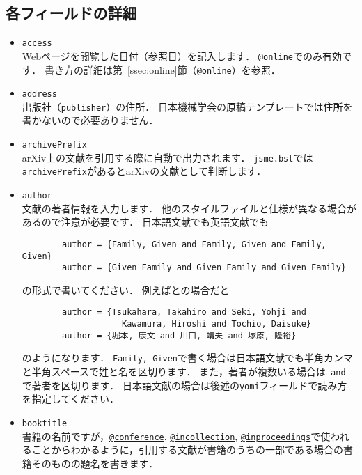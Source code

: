 \documentclass[a4paper,fleqn,uplatex,dvipdfmx]{jsarticle}
\makeatletter
\newcommand{\jsmefile}{\texttt{jsme.bst}}
\newcommand{\ttconference}{\texttt{@conference}}
\newcommand{\ttincollection}{\texttt{@incollection}}
\newcommand{\ttinproceedings}{\texttt{@inproceedings}}
\newcommand{\ttonline}{\texttt{@online}}
\makeatother
\begin{document}
\subsection{各フィールドの詳細}
\label{ssec:field}
\begin{itemize}
    \item \verb|access| \\
        Webページを閲覧した日付（参照日）を記入します．
        \ttonline でのみ有効です．
        書き方の詳細は第~\ref{ssec:online}節（\ttonline ）を参照．
    \item \verb|address| \\
        出版社（\verb|publisher|）の住所．
        日本機械学会の原稿テンプレートでは住所を書かないので必要ありません．
    \item \verb|archivePrefix| \\
        arXiv上の文献を引用する際に自動で出力されます．
        \jsmefile では\verb|archivePrefix|があるとarXivの文献として判断します．
    \item \verb|author| \\
        文献の著者情報を入力します．
        他の\BibTeX{}スタイルファイルと仕様が異なる場合があるので注意が必要です．
        日本語文献でも英語文献でも
        \begin{verbatim}
        author = {Family, Given and Family, Given and Family, Given}
        author = {Given Family and Given Family and Given Family}
        \end{verbatim}
        の形式で書いてください．
        例えば\citet{Tsukahara:TSFP2005}と\citet{堀本:可視化情報2020}の場合だと
        \begin{verbatim}
        author = {Tsukahara, Takahiro and Seki, Yohji and 
                    Kawamura, Hiroshi and Tochio, Daisuke}
        author = {堀本, 康文 and 川口, 靖夫 and 塚原, 隆裕}
        \end{verbatim}
        のようになります．
        \verb|Family, Given|で書く場合は日本語文献でも半角カンマと半角スペースで姓と名を区切ります．
        また，著者が複数いる場合は\verb| and |で著者を区切ります．
        日本語文献の場合は後述の\verb|yomi|フィールドで読み方を指定してください．
    \item \verb|booktitle| \\
        書籍の名前ですが，\hyperref[ssec:conference]{\ttconference}, \hyperref[ssec:incollection]{\ttincollection}, \hyperref[ssec:inproceedings]{\ttinproceedings}で使われることからわかるように，引用する文献が書籍のうちの一部である場合の書籍そのものの題名を書きます．

\end{itemize}
\end{document}
